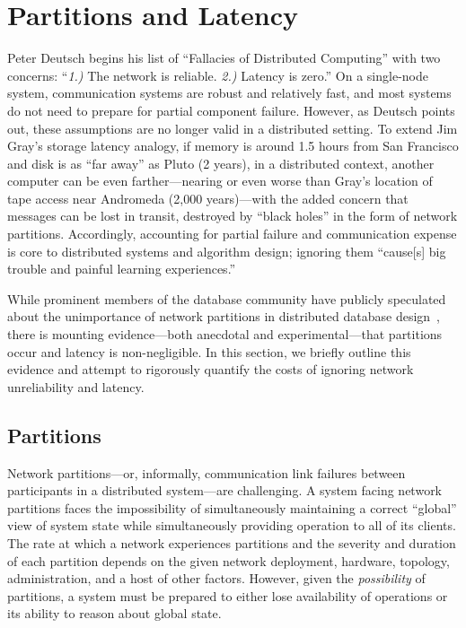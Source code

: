 
\section{Partitions and Latency}

Peter Deutsch begins his list of ``Fallacies of Distributed
Computing'' with two concerns: ``\textit{1.)}  The network is
reliable. \textit{2.)} Latency is zero.'' On a single-node system,
communication systems are robust and relatively fast, and most systems
do not need to prepare for partial component failure. However, as
Deutsch points out, these assumptions are no longer valid in a
distributed setting. To extend Jim Gray's storage latency analogy, if
memory is around 1.5 hours from San Francisco and disk is as ``far
away'' as Pluto (2 years), in a distributed context, another computer
can be even farther---nearing or even worse than Gray's location of
tape access near Andromeda (2,000 years)---with the added concern that
messages can be lost in transit, destroyed by ``black holes'' in the
form of network partitions. Accordingly, accounting for partial
failure and communication expense is core to distributed systems and
algorithm design; ignoring them ``cause[s] big trouble and painful
learning experiences.''

While prominent members of the database community have publicly
speculated about the unimportance of network partitions in distributed
database design~\cite{stonebraker2010errors}, there is mounting
evidence---both anecdotal and experimental---that partitions occur and
latency is non-negligible. In this section, we briefly outline this
evidence and attempt to rigorously quantify the costs of ignoring
network unreliability and latency.

\subsection{Partitions}

Network partitions---or, informally, communication link failures
between participants in a distributed system---are challenging. A
system facing network partitions faces the impossibility of
simultaneously maintaining a correct ``global'' view of system state
while simultaneously providing operation to all of its clients. The
rate at which a network experiences partitions and the severity and
duration of each partition depends on the given network deployment,
hardware, topology, administration, and a host of other
factors. However, given the \textit{possibility} of partitions, a
system must be prepared to either lose availability of operations or
its ability to reason about global state.

